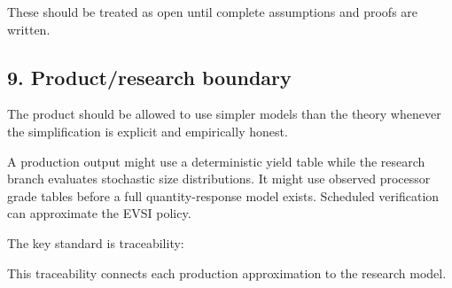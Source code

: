 These should be treated as open until complete assumptions and proofs are
written.

\subsection{9. Product/research boundary}\label{productresearch-boundary}

The product should be allowed to use simpler models than the theory whenever the
simplification is explicit and empirically honest.

A production output might use a deterministic yield table while the research
branch evaluates stochastic size distributions. It might use observed processor
grade tables before a full quantity-response model exists. Scheduled verification
can approximate the EVSI policy.

The key standard is traceability:

\begin{Shaded}
\begin{Highlighting}[]
\end{Highlighting}
\end{Shaded}

This traceability connects each production approximation to the research model.
